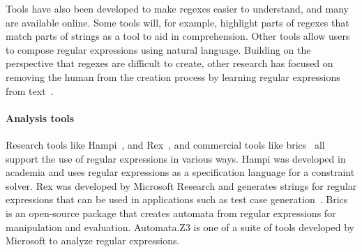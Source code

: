 Tools have also been developed to make regexes easier to understand, and many are available online.  Some tools will, for example, highlight parts of regexes that match parts of strings as a tool to aid in comprehension.  Other tools allow users to compose regular expressions using natural language.  Building on the perspective that regexes are difficult to create, other research has focused on removing the human from the creation process by learning regular expressions from  text~\cite{Babbar:2010:CBA:1871840.1871848, Li:2008:REL:1613715.1613719}.

\paragraph{Analysis tools} Research tools like Hampi~\cite{hampi}, and Rex~\cite{rex}, and commercial tools like brics~\cite{brics} all support the use of regular expressions in various ways. Hampi was developed  in academia and uses regular expressions as a specification language for a constraint solver. Rex was developed by Microsoft Research and generates strings for regular expressions that can be used in  applications such as test case generation~\cite{Anand:2013:OSM:2503903.2503991, Tillmann:2014:TAT:2642937.2642941}. Brics is an open-source package that creates automata from regular expressions for manipulation and evaluation. Automata.Z3 is one of a suite of tools developed by Microsoft to analyze regular expressions.
